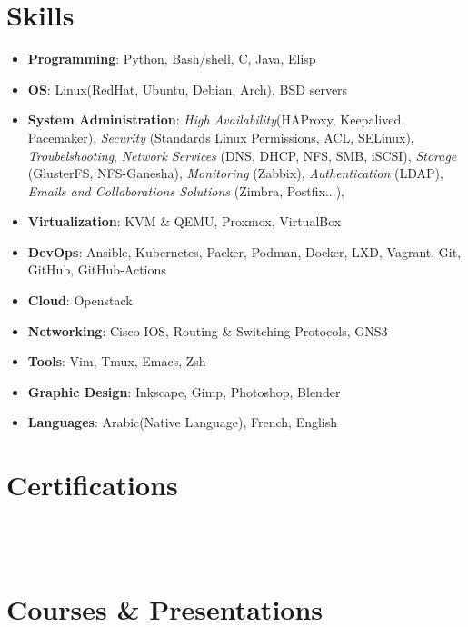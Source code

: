 \documentclass{cv}
\begin{document}
\section{Skills}
\begin{itemize}
  \item{\bf{Programming}}: Python, Bash/shell, C, Java, Elisp 
  \item{\bf{OS}}: Linux(RedHat, Ubuntu, Debian, Arch), BSD servers
  \item{\bf{System Administration}}: 
    \emph{High Availability}(HAProxy, Keepalived, Pacemaker),
    \emph{Security} (Standards Linux Permissions, ACL, SELinux),
    \emph{Troubelshooting},
    \emph{Network Services} (DNS, DHCP, NFS, SMB, iSCSI),
    \emph{Storage} (GlusterFS, NFS-Ganesha),
    \emph{Monitoring} (Zabbix),
    \emph{Authentication} (LDAP),
    \emph{Emails and Collaborations Solutions} (Zimbra, Postfix...),

  \item{\bf{Virtualization}}: KVM \& QEMU, Proxmox, VirtualBox
  \item{\bf{DevOps}}: Ansible, Kubernetes, Packer, Podman, Docker, LXD, Vagrant, Git, GitHub, GitHub-Actions
  \item{\bf{Cloud}}: Openstack
  \item{\bf{Networking}}: Cisco IOS, Routing \& Switching Protocols, GNS3
  \item{\bf{Tools}}: Vim, Tmux, Emacs, Zsh
  \item{\bf{Graphic Design}}: Inkscape, Gimp, Photoshop, Blender
  \item{\bf{Languages}}: Arabic(Native Language), French, English

\end{itemize}


\section{Certifications}
  \\
  \\


\section{Courses \& Presentations}
\end{document}
